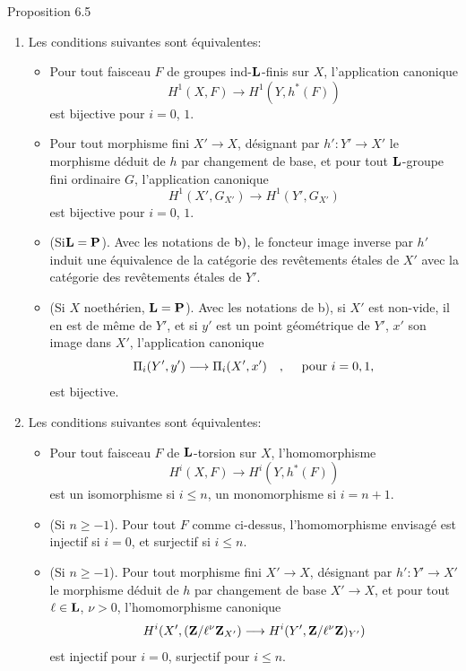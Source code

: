 \documentclass[10pt]{../fichiers-configuration-latex/smfart}
\begin{document}
\begin{enonce*}{Proposition 6.5}
\begin{enumerate}
\item Les conditions suivantes sont équivalentes:
\begin{itemize}
\item[a)] Pour tout faisceau $F$ de groupes ind-$\mathbf{L}$-finis sur
$X$, l'application canonique
$$
H^1(X,F)\longrightarrow H^1(Y,h^{\ast}(F))
$$
est bijective pour $i=0$, $1$.

\item[b)] Pour tout morphisme fini $X'\rightarrow X$, désignant par
$h':Y'\rightarrow X'$ le morphisme déduit de $h$ par changement de
base, et pour tout $\mathbf{L}$-groupe fini ordinaire $G$,
l'application canonique
$$
H^1(X',G_{X'})\longrightarrow H^1(Y',G_{X'})
$$
est bijective pour $i=0$, $1$.

\item[${\rm b')}$] (Si\pageoriginale $\mathbf{L}=\mathbf{P}$). Avec
les notations de ${\rm b)}$, le foncteur image inverse par $h'$ induit
une équivalence de la catégorie des revêtements étales de $X'$ avec la
catégorie des revêtements étales de $Y'$.

\item[${\rm b'')}$] (Si $X$ noethérien, $\mathbf{L}=\mathbf{P}$). Avec
les notations de {\rm b)}, si $X'$ est non-vide, il en est de même de
$Y'$, et si $y'$ est un point géométrique de $Y'$, $x'$ son image dans
$X'$, l'application canonique
$$
\Pi_i(Y',y')\longrightarrow \Pi_i(X', x')\quad,\quad \mbox{ pour }
i=0,1{},
$$
est bijective.
\end{itemize}

\item Les conditions suivantes sont équivalentes:
\begin{itemize}
\item[a)] Pour tout faisceau $F$ de $\mathbf{L}$-torsion sur $X$,
l'homomorphisme
$$
H^{i}(X,F)\longrightarrow H^{i}(Y,h^{\ast}(F))
$$
est un isomorphisme si $i\leq n$, un monomorphisme si $i=n+1$.

\item[${\rm a')}$] (Si $n\geq -1$). Pour tout $F$ comme ci-dessus,
l'homomorphisme envisagé est injectif si $i=0$, et surjectif si $i\leq
n$.

\item[b)] (Si $n\geq -1$). Pour tout morphisme fini $X'\rightarrow X$,
désignant par $h':Y'\rightarrow X'$ le morphisme déduit de $h$ par
changement de base $X'\rightarrow X$, et pour tout $\ell\in
\mathbf{L}$, $\nu>0$, l'homomorphisme canonique
$$
H^{i}(X',(\mathbf{Z}/\ell^{\nu}\mathbf{Z}_{X'})\longrightarrow
H^{i}(Y',\mathbf{Z}/\ell^{\nu}\mathbf{Z})_{Y'})
$$
est injectif pour $i=0$, surjectif pour $i\leq n$.
\end{itemize}
\end{enumerate}
\end{enonce*}
\end{document}
